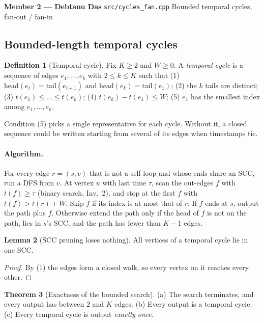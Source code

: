 \documentclass[11pt,a4paper]{article}
\theoremstyle{definition}
\newtheorem{definition}{Definition}
\newtheorem{theorem}[definition]{Theorem}
\newtheorem{lemma}[definition]{Lemma}
\begin{document}
\begin{memberstrip}
\small\textbf{Member 2 --- Debtanu Das} \hfill \texttt{src/cycles\_fan.cpp} \quad Bounded temporal cycles, fan-out / fan-in
\end{memberstrip}

\subsection{Bounded-length temporal cycles}
\begin{definition}[Temporal cycle]
Fix $K \ge 2$ and $W \ge 0$. A \emph{temporal cycle} is a sequence of edges $e_1, \dots, e_k$ with $2 \le k \le K$ such that (1) $\text{head}(e_i) = \text{tail}(e_{i+1})$ and $\text{head}(e_k) = \text{tail}(e_1)$; (2) the $k$ tails are distinct; (3) $t(e_1) \le \dots \le t(e_k)$; (4) $t(e_k) - t(e_1) \le W$; (5) $e_1$ has the smallest index among $e_1, \dots, e_k$.
\end{definition}

Condition (5) picks a single representative for each cycle. Without it, a closed sequence could be written starting from several of its edges when timestamps tie.

\paragraph{Algorithm.} For every edge $r = (s, v)$ that is not a self loop and whose ends share an SCC, run a DFS from $v$. At vertex $u$ with last time $\tau$, scan the out-edges $f$ with $t(f) \ge \tau$ (binary search, Inv.~2), and stop at the first $f$ with $t(f) > t(r) + W$. Skip $f$ if its index is at most that of $r$. If $f$ ends at $s$, output the path plus $f$. Otherwise extend the path only if the head of $f$ is not on the path, lies in $s$'s SCC, and the path has fewer than $K - 1$ edges.

\begin{lemma}[SCC pruning loses nothing]
All vertices of a temporal cycle lie in one SCC.
\end{lemma}
\begin{proof}
By (1) the edges form a closed walk, so every vertex on it reaches every other.
\end{proof}

\begin{theorem}[Exactness of the bounded search]
(a) The search terminates, and every output has between $2$ and $K$ edges. (b) Every output is a temporal cycle. (c) Every temporal cycle is output \emph{exactly once}.
\end{theorem}
\end{document}
